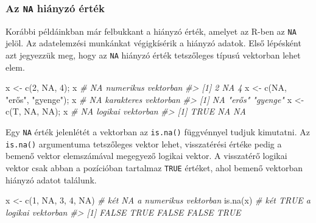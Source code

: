 \documentclass[
]{book}
\newenvironment{Shaded}{\begin{snugshade}}{\end{snugshade}}
\newcommand{\CommentTok}[1]{\textcolor[rgb]{0.56,0.35,0.01}{\textit{#1}}}
\newcommand{\ConstantTok}[1]{\textcolor[rgb]{0.00,0.00,0.00}{#1}}
\newcommand{\DecValTok}[1]{\textcolor[rgb]{0.00,0.00,0.81}{#1}}
\newcommand{\FunctionTok}[1]{\textcolor[rgb]{0.00,0.00,0.00}{#1}}
\newcommand{\NormalTok}[1]{#1}
\newcommand{\OtherTok}[1]{\textcolor[rgb]{0.56,0.35,0.01}{#1}}
\newcommand{\StringTok}[1]{\textcolor[rgb]{0.31,0.60,0.02}{#1}}
\begin{document}
\hypertarget{az-na-hiuxe1nyzuxf3-uxe9rtuxe9k}{%
\subsubsection{\texorpdfstring{Az \texttt{NA} hiányzó érték}{Az NA hiányzó érték}}\label{az-na-hiuxe1nyzuxf3-uxe9rtuxe9k}}

Korábbi példáinkban már felbukkant a hiányzó érték, amelyet az R-ben az \texttt{NA} jelöl. Az adatelemzési munkánkat végigkísérik a hiányzó adatok. Első lépésként azt jegyezzük meg, hogy az \texttt{NA} hiányzó érték tetszőleges típusú vektorban lehet elem.

\begin{Shaded}
\begin{Highlighting}[]
\NormalTok{x }\OtherTok{\textless{}{-}} \FunctionTok{c}\NormalTok{(}\DecValTok{2}\NormalTok{, }\ConstantTok{NA}\NormalTok{, }\DecValTok{4}\NormalTok{); x              }\CommentTok{\# NA numerikus vektorban}
\CommentTok{\#\textgreater{} [1]  2 NA  4}
\NormalTok{x }\OtherTok{\textless{}{-}} \FunctionTok{c}\NormalTok{(}\ConstantTok{NA}\NormalTok{, }\StringTok{"erős"}\NormalTok{, }\StringTok{"gyenge"}\NormalTok{); x  }\CommentTok{\# NA karakteres vektorban}
\CommentTok{\#\textgreater{} [1] NA       "erős"   "gyenge"}
\NormalTok{x }\OtherTok{\textless{}{-}} \FunctionTok{c}\NormalTok{(T, }\ConstantTok{NA}\NormalTok{, }\ConstantTok{NA}\NormalTok{); x             }\CommentTok{\# NA logikai vektorban}
\CommentTok{\#\textgreater{} [1] TRUE   NA   NA}
\end{Highlighting}
\end{Shaded}

Egy \texttt{NA} érték jelenlétét a vektorban az \texttt{is.na()} függvénnyel tudjuk kimutatni. Az \texttt{is.na()} argumentuma tetszőleges vektor lehet, visszatérési értéke pedig a bemenő vektor elemszámával megegyező logikai vektor. A visszatérő logikai vektor csak abban a pozícióban tartalmaz \texttt{TRUE} értéket, ahol bemenő vektorban hiányzó adatot találunk.

\begin{Shaded}
\begin{Highlighting}[]
\NormalTok{x }\OtherTok{\textless{}{-}} \FunctionTok{c}\NormalTok{(}\DecValTok{1}\NormalTok{, }\ConstantTok{NA}\NormalTok{, }\DecValTok{3}\NormalTok{, }\DecValTok{4}\NormalTok{, }\ConstantTok{NA}\NormalTok{)    }\CommentTok{\# két NA a numerikus vektorban}
\FunctionTok{is.na}\NormalTok{(x)                   }\CommentTok{\# két TRUE a logikai vektorban}
\CommentTok{\#\textgreater{} [1] FALSE  TRUE FALSE FALSE  TRUE}
\end{Highlighting}
\end{Shaded}
\end{document}
